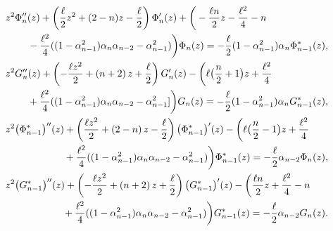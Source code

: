 \documentclass[12pt]{amsart}
\begin{document}
\begin{align*}
\begin{multlined}[t][.95\textwidth]
z^2\Phi_n^{\prime\prime}(z)+\left( \frac{ \ell }{2}z^2+(2-n)z-\frac{ \ell }{2}\right) \Phi_n^{\prime}(z)+\bigg( -\frac{\ell n}{2}z-\frac{\ell^2}{4}-n\\
 -\frac{\ell^2}{4}((1-\alpha_{n-1}^2)\alpha_n\alpha_{n-2}-\alpha_{n-1}^2) \bigg) \Phi_n(z)=-\frac{ \ell }{2}(1-\alpha_{n-1}^2)\alpha_n\Phi_{n-1}^*(z) ,
\end{multlined} 
 \\
\begin{multlined}[t][.95\textwidth]
z^2G_n^{\prime\prime}(z)+\left( -\frac{\ell z^2}{2}+\left(n+2\right) z+\frac{ \ell }{2}\right) G_n^{\prime}(z)-\bigg( \ell\big(\frac{n}{2}+1\big) z+\frac{\ell^2}{4}\\
+\frac{\ell^2}{4}( (1-\alpha_{n-1}^2)\alpha_n\alpha_{n-2}-\alpha_{n-1}^2]\bigg) G_n(z)=-\frac{ \ell }{2}(1-\alpha_{n-1}^2)\alpha_n G_{n-1}^*(z),
\end{multlined}
 \\ 
\begin{multlined}[t][.95\textwidth]
z^2 \big( \Phi_{n-1}^* \big) ^{\prime\prime}(z)
+\left( \frac{\ell z^2}{2}+\left(2-n\right) z -\frac{ \ell }{2}\right) \big( \Phi_{n-1}^* \big)^{\prime}(z)-\bigg( \ell \big(\frac{n}{2}-1\big)z+\frac{\ell^2}{4} \\
+\frac{\ell^2}{4} ( (1-\alpha_{n-1}^2)\alpha_n\alpha_{n-2}-\alpha_{n-1}^2) \bigg) \Phi_{n-1}^*(z)=-\frac{ \ell }{2}\alpha_{n-2}\Phi_n(z),
\end{multlined}
\\ 
\begin{multlined}[t][.95\textwidth]
z^2 \big( G_{n-1}^* \big)^{\prime\prime}(z)+\left(-\frac{\ell z^2}{2}+\left(n+2\right) z+\frac{ \ell }{2}\right) \big( G_{n-1}^* \big)^{\prime}(z)-\bigg( \frac{\ell n}{2}z+\frac{\ell^2}{4}-n
 \\
+\frac{\ell^2}{4}( (1-\alpha_{n-1}^2)\alpha
_n\alpha_{n-2}-\alpha_{n-1}^2) \bigg)G_{n-1}^*(z)=-\frac{ \ell }{2}\alpha_{n-2}G_n(z).
\end{multlined}
\end{align*}
\end{document}

